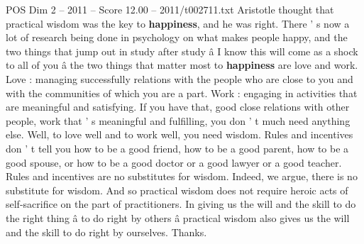 \begin{textsample}{POS Dim 2 – 2011 – Score 12.00 – 2011/t002711.txt}
Aristotle thought that practical wisdom was the key to \textbf{happiness}, and he was right.
There ' s now a lot of research being done in psychology on what makes people happy, and the two things that jump out in study after study â I know this will come as a shock to all of you â the two things that matter most to \textbf{happiness} are love and work.
Love : managing successfully relations with the people who are close to you and with the communities of which you are a part.
Work : engaging in activities that are meaningful and satisfying.
If you have that, good close relations with other people, work that ' s meaningful and fulfilling, you don ' t much need anything else.
Well, to love well and to work well, you need wisdom.
Rules and incentives don ' t tell you how to be a good friend, how to be a good parent, how to be a good spouse, or how to be a good doctor or a good lawyer or a good teacher.
Rules and incentives are no substitutes for wisdom.
Indeed, we argue, there is no substitute for wisdom.
And so practical wisdom does not require heroic acts of self-sacrifice on the part of practitioners.
In giving us the will and the skill to do the right thing â to do right by others â practical wisdom also gives us the will and the skill to do right by ourselves.
Thanks.

\end{textsample}
